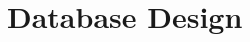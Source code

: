 \documentclass[../DD.tex]{subfiles}
\begin{document}
\chapter{Database Design}
\thispagestyle{fancy}
		
		
				
\end{document}
